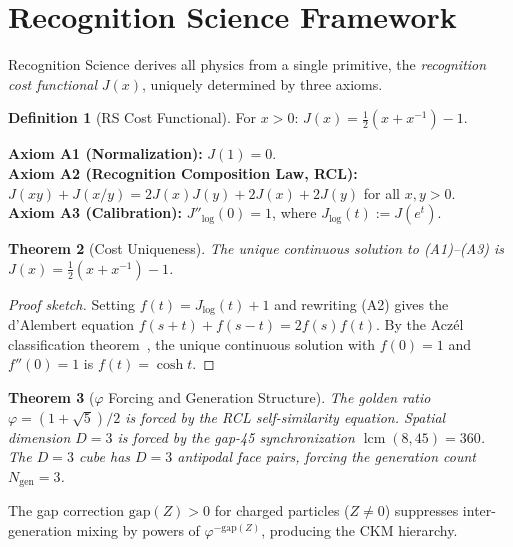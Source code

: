 \documentclass[12pt,a4paper]{article}
\newtheorem{theorem}{Theorem}[section]
\theoremstyle{definition}
\newtheorem{definition}[theorem]{Definition}
\theoremstyle{remark}
\begin{document}
\section{Recognition Science Framework}
\label{sec:framework}

Recognition Science derives all physics from a single primitive,
the \emph{recognition cost functional} $J(x)$, uniquely determined
by three axioms.

\begin{definition}[RS Cost Functional]
For $x > 0$: $J(x) = \tfrac{1}{2}(x + x^{-1}) - 1$.
\end{definition}

\noindent\textbf{Axiom A1 (Normalization):} $J(1) = 0$.\\
\textbf{Axiom A2 (Recognition Composition Law, RCL):}
$J(xy) + J(x/y) = 2J(x)J(y) + 2J(x) + 2J(y)$ for all $x, y > 0$.\\
\textbf{Axiom A3 (Calibration):} $J''_{\log}(0) = 1$, where
$J_{\log}(t) := J(e^t)$.

\begin{theorem}[Cost Uniqueness]
\label{thm:unique}
The unique continuous solution to \textup{(A1)--(A3)} is
$J(x) = \tfrac{1}{2}(x + x^{-1}) - 1$.
\end{theorem}

\begin{proof}[Proof sketch]
Setting $f(t) = J_{\log}(t) + 1$ and rewriting \textup{(A2)} gives the
d'Alembert equation $f(s+t) + f(s-t) = 2f(s)f(t)$.  By the Acz\'el
classification theorem~\cite{Aczel1966}, the unique continuous solution
with $f(0) = 1$ and $f''(0) = 1$ is $f(t) = \cosh t$.
\end{proof}

\begin{theorem}[$\varphi$ Forcing and Generation Structure]
\label{thm:phi}
The golden ratio $\varphi = (1+\sqrt{5})/2$ is forced by the RCL
self-similarity equation.  Spatial dimension $D = 3$ is forced by
the gap-45 synchronization $\operatorname{lcm}(8,45) = 360$.  The
$D = 3$ cube has $D = 3$ antipodal face pairs, forcing the
generation count $N_{\mathrm{gen}} = 3$.
\end{theorem}

\noindent The gap correction $\mathrm{gap}(Z) > 0$ for charged particles
($Z \neq 0$) suppresses inter-generation mixing by powers of
$\varphi^{-\mathrm{gap}(Z)}$, producing the CKM hierarchy.
\end{document}
